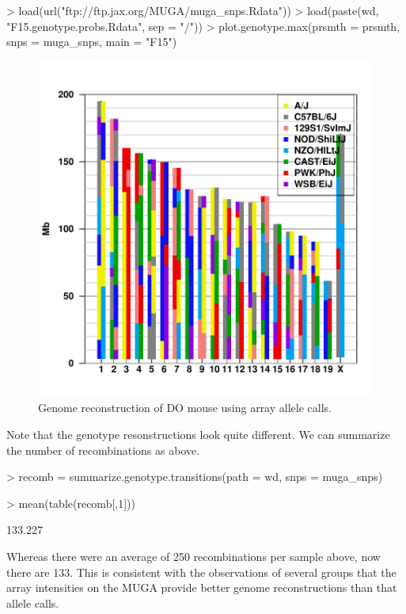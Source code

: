 \documentclass{article}
\begin{document}
\begin{Schunk}
\begin{Sinput}
> load(url("ftp://ftp.jax.org/MUGA/muga_snps.Rdata"))
> load(paste(wd, "F15.genotype.probs.Rdata", sep = "/"))
> plot.genotype.max(prsmth = prsmth, snps = muga_snps, main = "F15")
\end{Sinput}
\end{Schunk}

\begin{figure}
\begin{center}
\includegraphics{Genotyping_DO_Mice-fig3}
\end{center}
\caption{Genome reconstruction of DO mouse using array allele calls. }
\label{fig:allele_genoplot}
\end{figure}

Note that the genotype resonstructions look quite different. We can summarize the number of recombinations as above.

\begin{Schunk}
\begin{Sinput}
> recomb = summarize.genotype.transitions(path = wd, snps = muga_snps)
\end{Sinput}
\end{Schunk}

\begin{Schunk}
\begin{Sinput}
> mean(table(recomb[,1]))
\end{Sinput}
\begin{Soutput}
[1] 133.227
\end{Soutput}
\end{Schunk}

Whereas there were an average of 250 recombinations per sample above, now there are 133. This is consistent with the observations of several groups that the array intensities on the MUGA provide better genome reconstructions than that allele calls.
\end{document}
